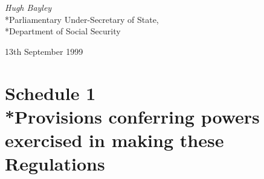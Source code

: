 \documentclass[12pt,a4paper]{article}
\begin{document}
{\raggedleft
\emph{Hugh Bayley}\\*Parliamentary Under-Secretary of State,\\*Department of Social Security

}


13th September 1999

\small

\part[Schedule 1 --- Provisions conferring powers exercised in making these Regulations]{Schedule 1\\*Provisions conferring powers exercised in making these Regulations}

\renewcommand\parthead{--- Schedule 1}
\end{document}
